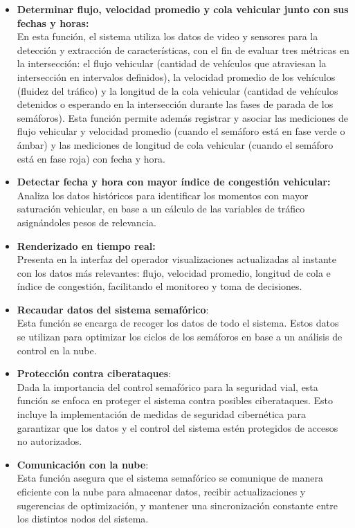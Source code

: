 \documentclass[12pt,a4paper,oneside]{report}
\begin{document}
\begin{itemize}
\item
  \textbf{Determinar flujo, velocidad promedio y cola vehicular junto con sus fechas y horas:\\
  }En esta función, el sistema utiliza los datos de video y sensores para la detección y extracción de características, con el fin de evaluar tres métricas en la intersección: el flujo vehicular (cantidad de vehículos que atraviesan la intersección en intervalos definidos), la velocidad promedio de los vehículos (fluidez del tráfico) y la longitud de la cola vehicular (cantidad de vehículos detenidos o esperando en la intersección durante las fases de parada de los semáforos). Esta función permite además registrar y asociar las mediciones de flujo vehicular y velocidad promedio (cuando el semáforo está en fase verde o ámbar) y las mediciones de longitud de cola vehicular (cuando el semáforo está en fase roja) con fecha y hora.
\item
  \textbf{Detectar fecha y hora con mayor índice de congestión vehicular:\\
  }Analiza los datos históricos para identificar los momentos con mayor saturación vehicular, en base a un cálculo de las variables de tráfico asignándoles pesos de relevancia.
\item
  \textbf{Renderizado en tiempo real:\\
  }Presenta en la interfaz del operador visualizaciones actualizadas al instante con los datos más relevantes: flujo, velocidad promedio, longitud de cola e índice de congestión, facilitando el monitoreo y toma de decisiones.
\item
  \textbf{Recaudar datos del sistema semafórico}:\\
  Esta función se encarga de recoger los datos de todo el sistema. Estos datos se utilizan para optimizar los ciclos de los semáforos en base a un análisis de control en la nube.
\item
  \textbf{Protección contra ciberataques}:\\
  Dada la importancia del control semafórico para la seguridad vial, esta función se enfoca en proteger el sistema contra posibles ciberataques. Esto incluye la implementación de medidas de seguridad cibernética para garantizar que los datos y el control del sistema estén protegidos de accesos no autorizados.
\item
  \textbf{Comunicación con la nube}:\\
  Esta función asegura que el sistema semafórico se comunique de manera eficiente con la nube para almacenar datos, recibir actualizaciones y sugerencias de optimización, y mantener una sincronización constante entre los distintos nodos del sistema.

\end{itemize}
\end{document}
